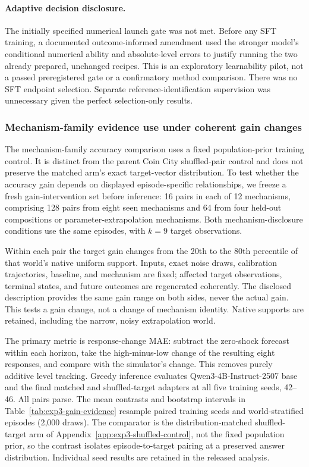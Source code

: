 \paragraph{Adaptive decision disclosure.}
The initially specified numerical launch gate was not met. Before any SFT
training, a documented outcome-informed amendment used the stronger model's
conditional numerical ability and absolute-level errors to justify running the
two already prepared, unchanged recipes. This is an exploratory learnability
pilot, not a passed preregistered gate or a confirmatory method comparison.
There was no SFT endpoint selection. Separate reference-identification
supervision was unnecessary given the perfect selection-only results.

\subsubsection{Mechanism-family evidence use under coherent gain changes}
\label{app:exp3-evidence-use}

The mechanism-family accuracy comparison uses a fixed population-prior training
control. It is distinct from the parent Coin City shuffled-pair control and
does not preserve the matched arm's exact target-vector distribution. To test
whether the accuracy gain depends on displayed episode-specific relationships,
we freeze a fresh gain-intervention set before inference: 16 pairs in each of
12 mechanisms, comprising 128 pairs from eight seen mechanisms and 64 from
four held-out compositions or parameter-extrapolation mechanisms. Both
mechanism-disclosure conditions use the same episodes, with $k=9$ target
observations.

Within each pair the target gain changes from the 20th to the 80th percentile
of that world's native uniform support. Inputs, exact noise draws, calibration
trajectories, baseline, and mechanism are fixed; affected target observations,
terminal states, and future outcomes are regenerated coherently. The disclosed
description provides the same gain range on both sides, never the actual gain.
This tests a gain change, not a change of mechanism identity. Native supports
are retained, including the narrow, noisy extrapolation world.

The primary metric is response-change MAE: subtract the zero-shock forecast
within each horizon, take the high-minus-low change of the resulting eight
responses, and compare with the simulator's change. This removes purely
additive level tracking. Greedy inference evaluates Qwen3-4B-Instruct-2507
base and the final matched and shuffled-target adapters at all five training
seeds, 42--46. All pairs parse. The mean contrasts and bootstrap intervals in
Table~\ref{tab:exp3-gain-evidence} resample paired training seeds and
world-stratified episodes (2,000 draws). The comparator is the
distribution-matched shuffled-target arm of
Appendix~\ref{app:exp3-shuffled-control}, not the fixed population prior, so
the contrast isolates episode-to-target pairing at a preserved answer
distribution. Individual seed results are retained in the released analysis.

